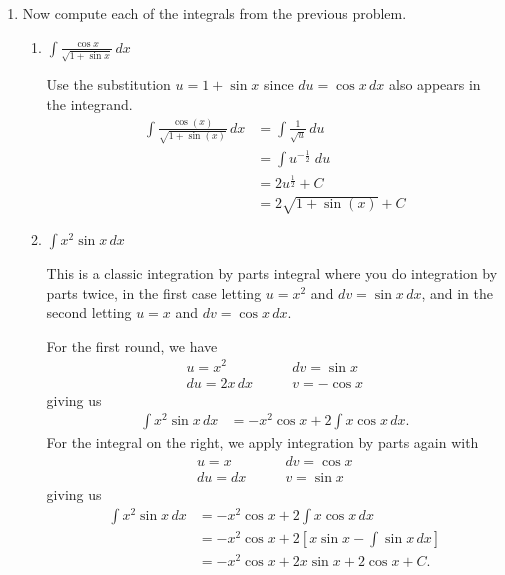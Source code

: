 \documentclass[main]{subfiles}
\begin{document}
\begin{enumerate}
\item Now compute each of the integrals from the previous problem.

\begin{enumerate}
    \item 
    \begin{problem}[\vfill]
        $\displaystyle \int \frac{\cos x}{\sqrt{1+\sin x}} \,dx$
    \end{problem}

    \begin{solution}
        Use the substitution $u=1+\sin x$ since $du = \cos x\,dx$ also
        appears in the integrand.
        \begin{align*}
            \int \frac{\cos(x)}{\sqrt{1+\sin(x)}}\, dx &= \int \frac{1}{\sqrt{u}}\, du \\
            &= \int u^{-\frac{1}{2}}\;du \\
            &= 2u^{\frac{1}{2}}+C \\
            &= 2\sqrt{1+\sin(x)} + C
        \end{align*}
    \end{solution}

    \item
    \begin{problem}[\vfill]
        $\displaystyle \int x^2 \sin x\, dx$
    \end{problem}

    \begin{solution}
        This is a classic integration by parts integral where you
        do integration by parts twice, in the first case letting
        $u=x^2$ and $dv= \sin x \, dx$, and in the second
        letting $u=x$ and $dv = \cos x \, dx$.

        For the first round, we have
        \begin{align*}
            u = x^2 \qquad & dv = \sin x \\
            du = 2x\, dx \qquad & v = -\cos x
        \end{align*}
        giving us
        \begin{align*}
            \int x^2 \sin x \, dx &= -x^2 \cos x + 2\int x \cos x \,dx.
        \end{align*}
        For the integral on the right, we apply integration by
        parts again with
        \begin{align*}
            u = x \qquad & dv = \cos x \\
            du = dx \qquad & v = \sin x
        \end{align*}
        giving us
        \begin{align*}
            \int x^2 \sin x \, dx &= -x^2 \cos x + 2\int x \cos x \,dx \\
            &= -x^2 \cos x + 2\left[x\sin x - \int \sin x\,dx\right] \\
            &= -x^2 \cos x + 2x\sin x + 2\cos x + C.
        \end{align*}
    \end{solution}


\end{enumerate}
\end{enumerate}
\end{document}
